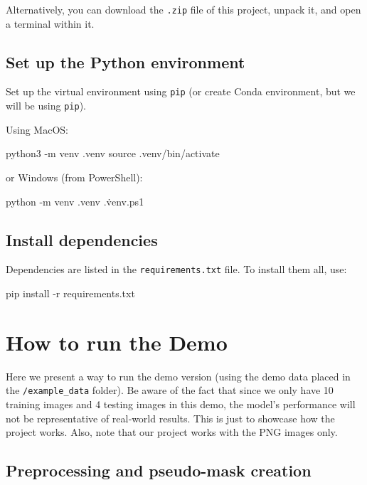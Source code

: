 Alternatively, you can download the \texttt{.zip} file of this project,
unpack it, and open a terminal within it.

\subsection{Set up the Python
environment}\label{set-up-the-python-environment}

Set up the virtual environment using \texttt{pip} (or create Conda
environment, but we will be using \texttt{pip}).

Using MacOS:

\begin{bashlisting}
python3 -m venv .venv
source .venv/bin/activate
\end{bashlisting}

or Windows (from PowerShell):

\begin{pslisting}
python -m venv .venv
.\.venv\Scripts\Activate.ps1 
\end{pslisting}

\subsection{Install dependencies}\label{install-dependencies}

Dependencies are listed in the \texttt{requirements.txt} file. To
install them all, use:

\begin{bashlisting}
pip install -r requirements.txt
\end{bashlisting}

\section{How to run the Demo}
\label{how-to-run-the-demo}

Here we present a way to run the demo version (using the demo data
placed in the \texttt{/example\_data} folder). Be aware of the fact that since we only have 10 training images and 4 testing images in this
demo, the model's performance will not be representative of real‐world results. This is just to showcase how
the project works. Also, note that our project works with the PNG images only.

\subsection{Preprocessing and pseudo-mask
creation}\label{preprocessing-and-pseudo-mask-creation}

